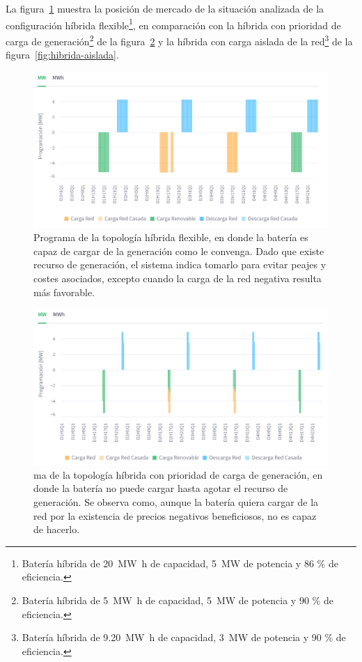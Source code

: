 La figura~\ref{fig:hibrida-flexible} muestra la posición de mercado de la situación analizada de la configuración híbrida flexible\footnote{Batería híbrida de \SI{20}{{\mega\watt\hour}} de capacidad, \SI{5}{{\mega\watt}} de potencia y 86 \% de eficiencia.}, en comparación con la híbrida con prioridad de carga de generación\footnote{Batería híbrida de \SI{5}{{\mega\watt\hour}} de capacidad, \SI{5}{{\mega\watt}} de potencia y 90 \% de eficiencia.} de la figura~\ref{fig:hibrida-prioridad} y la híbrida con carga aislada de la red\footnote{Batería híbrida de \SI{9.20}{{\mega\watt\hour}} de capacidad, \SI{3}{{\mega\watt}} de potencia y 90 \% de eficiencia.} de la figura~\ref{fig:hibrida-aislada}.

\begin{figure}
  \centering
  \includegraphics[width=0.75\linewidth]{figures/hibrida-flexible.png}
  \caption[Programa de la topología híbrida flexible.]{Programa de la topología híbrida flexible, en donde la batería es capaz de cargar de la generación como le convenga. Dado que existe recurso de generación, el sistema indica tomarlo para evitar peajes y costes asociados, excepto cuando la carga de la red negativa resulta más favorable.}%
  \label{fig:hibrida-flexible}
\end{figure}

\begin{figure}
  \centering
  \includegraphics[width=0.75\linewidth]{figures/hibrida-prioridad.png}
  \caption[Programa de la topología híbrida con prioridad de carga de generación.]{ma de la topología híbrida con prioridad de carga de generación, en donde la batería no puede cargar hasta agotar el recurso de generación. Se observa como, aunque la batería quiera cargar de la red por la existencia de precios negativos beneficiosos, no es capaz de hacerlo.}%
  \label{fig:hibrida-prioridad}
\end{figure}


